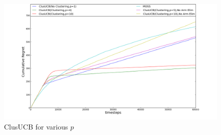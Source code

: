 \begin{remark}
\begin{figure}
\begin{center}
\includegraphics[scale=0.2]{img/ClusUCB(various_p)MOSS.png}
\caption{ClusUCB for various $p$}
\label{Fig:variousClus}
\end{center}
\end{figure}

\end{remark}

